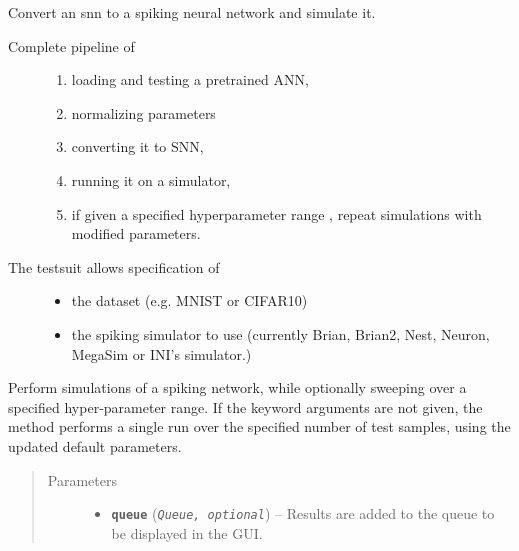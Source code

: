 \documentclass[letterpaper,10pt,english]{sphinxmanual}
\begin{document}
\begin{fulllineitems}
\label{core:core.pipeline.test_full}
Convert an snn to a spiking neural network and simulate it.
\begin{description}
\item[{Complete pipeline of}] \leavevmode\begin{enumerate}
\item {} 
loading and testing a pretrained ANN,

\item {} 
normalizing parameters

\item {} 
converting it to SNN,

\item {} 
running it on a simulator,

\item {} 
if given a specified hyperparameter range ,
repeat simulations with modified parameters.

\end{enumerate}

\item[{The testsuit allows specification of}] \leavevmode\begin{itemize}
\item {} 
the dataset (e.g. MNIST or CIFAR10)

\item {} 
the spiking simulator to use (currently Brian, Brian2, Nest, Neuron,
MegaSim or INI's simulator.)

\end{itemize}

\end{description}

Perform simulations of a spiking network, while optionally sweeping over a
specified hyper-parameter range. If the keyword arguments are not given,
the method performs a single run over the specified number of test samples,
using the updated default parameters.
\begin{quote}\begin{description}
\item[{Parameters}] \leavevmode\begin{itemize}
\item {} 
\textbf{\texttt{queue}} (\emph{\texttt{Queue, optional}}) -- Results are added to the queue to be displayed in the GUI.


\end{itemize}
\end{description}
\end{quote}
\end{fulllineitems}
\end{document}
